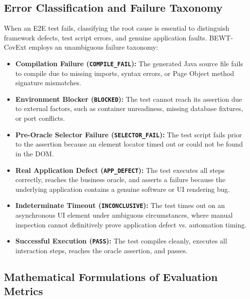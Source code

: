 \documentclass[pdflatex,sn-mathphys-num]{sn-jnl}
\begin{document}
\subsection{Error Classification and Failure Taxonomy}

When an E2E test fails, classifying the root cause is essential to distinguish framework defects, test script errors, and genuine application faults. BEWT-CovExt employs an unambiguous failure taxonomy:
\begin{itemize}
    \item \textbf{Compilation Failure (\texttt{COMPILE\_FAIL}):} The generated Java source file fails to compile due to missing imports, syntax errors, or Page Object method signature mismatches.
    \item \textbf{Environment Blocker (\texttt{BLOCKED}):} The test cannot reach its assertion due to external factors, such as container unreadiness, missing database fixtures, or port conflicts.
    \item \textbf{Pre-Oracle Selector Failure (\texttt{SELECTOR\_FAIL}):} The test script fails prior to the assertion because an element locator timed out or could not be found in the DOM.
    \item \textbf{Real Application Defect (\texttt{APP\_DEFECT}):} The test executes all steps correctly, reaches the business oracle, and asserts a failure because the underlying application contains a genuine software or UI rendering bug.
    \item \textbf{Indeterminate Timeout (\texttt{INCONCLUSIVE}):} The test times out on an asynchronous UI element under ambiguous circumstances, where manual inspection cannot definitively prove application defect vs. automation timing.
    \item \textbf{Successful Execution (\texttt{PASS}):} The test compiles cleanly, executes all interaction steps, reaches the oracle assertion, and passes.
\end{itemize}

\subsection{Mathematical Formulations of Evaluation Metrics}
\end{document}
